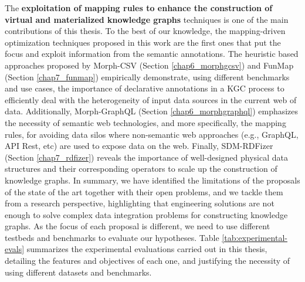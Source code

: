 The \textbf{exploitation of mapping rules to enhance the construction of virtual and materialized knowledge graphs} techniques is one of the main contributions of this thesis. To the best of our knowledge, the mapping-driven optimization techniques proposed in this work are the first ones that put the focus and exploit information from the semantic annotations. The heuristic based approaches proposed by Morph-CSV (Section \ref{chap6_morphgcsv}) and FunMap (Section \ref{chap7_funmap}) empirically demonstrate, using different benchmarks and use cases, the importance of declarative annotations in a KGC process to efficiently deal with the heterogeneity of input data sources in the current web of data. Additionally, Morph-GraphQL (Section \ref{chap6_morphgraphql}) emphasizes the necessity of semantic web technologies, and more specifically, the mapping rules, for avoiding data silos where non-semantic web approaches (e.g., GraphQL, API Rest, etc) are used to expose data on the web. Finally, SDM-RDFizer (Section \ref{chap7_rdfizer}) reveals the importance of well-designed physical data structures and their corresponding operators to scale up the construction of knowledge graphs. In summary, we have identified the limitations of the proposals of the state of the art together with their open problems, and we tackle them from a research perspective, highlighting that engineering solutions are not enough to solve complex data integration problems for constructing knowledge graphs. As the focus of each proposal is different, we need to use different testbeds and benchmarks to evaluate our hypotheses. Table \ref{tab:experimental-evals} summarizes the experimental evaluations carried out in this thesis, detailing the features and objectives of each one, and justifying the necessity of using different datasets and benchmarks.

